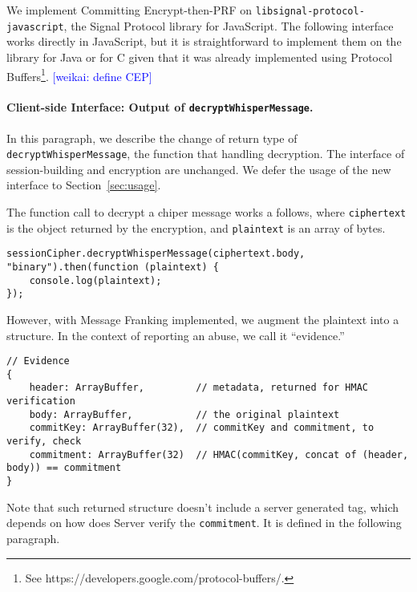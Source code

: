 \documentclass{article}
\newcommand{\weikai}[1]{\textcolor{blue}{[weikai: #1]}}
\begin{document}
We implement Committing Encrypt-then-PRF on {\tt libsignal-protocol-javascript},
the Signal Protocol library for JavaScript.
The following interface works directly in JavaScript,
but it is straightforward to 
implement them on the library for Java or for C
given that it was already implemented using Protocol Buffers\footnote{
See https://developers.google.com/protocol-buffers/.
}.
\weikai{define CEP}


\paragraph{Client-side Interface: Output of {\tt decryptWhisperMessage}.}
In this paragraph, 
we describe the change of return type of {\tt decryptWhisperMessage},
the function that handling decryption.
The interface of session-building and encryption are unchanged.
We defer the usage of the new interface to Section~\ref{sec:usage}.

The function call to decrypt a chiper message works a follows,
where {\tt ciphertext} is the object returned by the encryption,
and {\tt plaintext} is an array of bytes.
{\small
\begin{verbatim}
sessionCipher.decryptWhisperMessage(ciphertext.body, "binary").then(function (plaintext) {
    console.log(plaintext);
});
\end{verbatim}
}
However, with Message Franking implemented,
we augment the plaintext into a structure.
In the context of reporting an abuse, we call it ``evidence.''
{\small
\begin{verbatim}
// Evidence
{
    header: ArrayBuffer,         // metadata, returned for HMAC verification
    body: ArrayBuffer,           // the original plaintext
    commitKey: ArrayBuffer(32),  // commitKey and commitment, to verify, check
    commitment: ArrayBuffer(32)  // HMAC(commitKey, concat of (header, body)) == commitment
}
\end{verbatim}
}
Note that such returned structure doesn't include a server generated tag,
which depends on how does Server verify the {\tt commitment}.
It is defined in the following paragraph.
\end{document}
